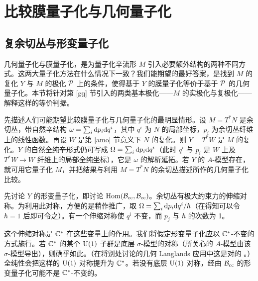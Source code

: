 \section{比较膜量子化与几何量子化}\label{comparing}

\subsection{复余切丛与形变量子化}\label{cotangent}

几何量子化与膜量子化，是为量子化辛流形 $M$ 引入必要额外结构的两种不同方式。这两大量子化方法在什么情况下一致？我们能期望的最好答案，是找到 $M$ 的复化 $Y$ 与 $M$ 的极化 $\P$ 上的条件，使得基于 $Y$ 的膜量子化等价于基于 $\P$ 的几何量子化。本节将针对第 \ref{gq} 节引入的两类基本极化——$M$ 的实极化与复极化——解释这样的等价判据。

先描述人们可能期望比较膜量子化与几何量子化的最明显情形。设 $M=T^*N$ 是余切丛，带自然辛结构 $\omega=\sum_i\d p_i\d q^i$，其中 $q^i$ 为 $N$ 的局部坐标，$p_i$ 为余切丛纤维上的线性函数。再设 $W$ 是第 \ref{amo} 节意义下 $N$ 的复化。则 $Y=T^*W$ 是 $M$ 的复化。$Y$ 的自然全纯辛形式仍可写成 $\Omega=\sum_i\d p_i\d q^i$（此时 $q^i$ 与 $p_i$ 是 $W$ 上及 $T^*W\to W$ 纤维上的局部全纯坐标），它是 $\omega$ 的解析延拓。若 $Y$ 的 $A$-模型存在，就可用它量子化 $M$，并把结果与利用 $M=T^*N$ 的余切丛描述所作的几何量子化比较。

先讨论 $Y$ 的形变量子化，即讨论 $\Hom(\B_\cc,\B_\cc)$。余切丛有极大约束力的伸缩对称。为利用此对称，方便的是稍作推广，取 $\Omega=\sum_i\d p_i\d q^i/\hbar$（在得知可以令 $\hbar=1$ 后即可令之）。有一个伸缩对称使 $q^i$ 不变，而 $p_j$ 与 $\hbar$ 的次数为 1。

这个伸缩对称是 $\C^*$ 在这些变量上的作用。我们将假定形变量子化应以 $\C^*$-不变的方式施行。若 $\C^*$ 的某个 $\UU(1)$ 子群是底层 $\sigma$-模型的对称（所关心的 $A$-模型由该 $\sigma$-模型导出），则确乎如此。（在将别处讨论的几何 Langlands 应用中这是对的 \cite{GaW}。）全纯性会把这样的 $\UU(1)$ 对称提升为 $\C^*$。若没有底层 $\UU(1)$ 对称，经由 $\B_\cc$ 的形变量子化可能不是 $\C^*$-不变的。

